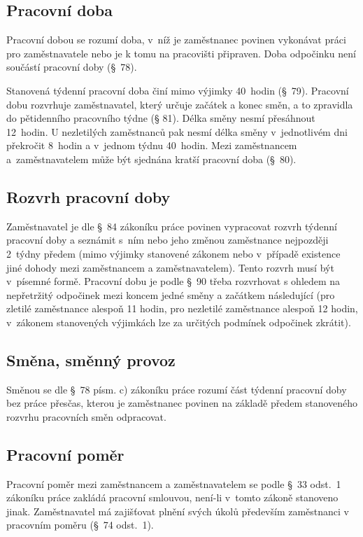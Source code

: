 \documentclass[twoside]{ctuthesis}
\begin{document}
\subsection{Pracovní doba}
Pracovní dobou se rozumí doba, v~níž je zaměstnanec povinen vykonávat práci pro zaměstnavatele nebo je k tomu na pracovišti připraven. Doba odpočinku není součástí pracovní doby (§~78).

Stanovená týdenní pracovní doba činí mimo výjimky 40~hodin (§~79). Pracovní dobu rozvrhuje zaměstnavatel, který určuje začátek a konec směn, a to zpravidla do pětidenního pracovního týdne (§ 81). Délka směny nesmí přesáhnout 12~hodin. U nezletilých zaměstnanců pak nesmí délka směny v~jednotlivém dni překročit 8~hodin a v~jednom týdnu 40~hodin. Mezi zaměstnancem a~zaměstnavatelem může být sjednána kratší pracovní doba (§~80).

\subsection{Rozvrh pracovní doby}
Zaměstnavatel je dle §~84 zákoníku práce povinen vypracovat rozvrh týdenní pracovní doby a seznámit s~ním nebo jeho změnou zaměstnance nejpozději 2~týdny předem (mimo výjimky stanovené zákonem nebo v~případě existence jiné dohody mezi zaměstnancem a zaměstnavatelem). Tento rozvrh musí být v~písemné formě. Pracovní dobu je podle §~90 třeba rozvrhovat s ohledem na nepřetržitý odpočinek mezi koncem jedné směny a začátkem následující (pro zletilé zaměstnance alespoň 11 hodin, pro nezletilé zaměstnance alespoň 12 hodin, v~zákonem stanovených výjimkách lze za určitých podmínek odpočinek zkrátit).

\subsection{Směna, směnný provoz}
Směnou se dle §~78 písm. c) zákoníku práce rozumí část týdenní pracovní doby bez práce přesčas, kterou je zaměstnanec povinen na základě předem stanoveného rozvrhu pracovních směn odpracovat.

\subsection{Pracovní poměr}
Pracovní poměr mezi zaměstnancem a zaměstnavatelem se podle §~33 odst.~1 zákoníku práce zakládá pracovní smlouvou, není-li v~tomto zákoně stanoveno jinak. Zaměstnavatel má zajišťovat plnění svých úkolů především zaměstnanci v pracovním poměru (§~74 odst.~1).
\end{document}
